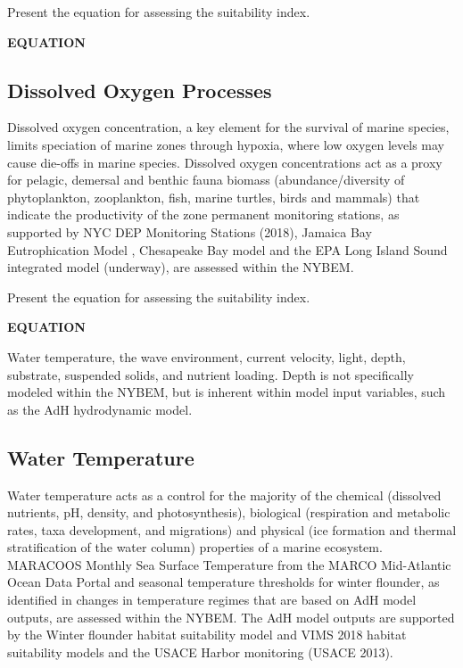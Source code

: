 \documentclass[
]{book}
\begin{document}
Present the equation for assessing the suitability index.

\textbf{EQUATION}

\hypertarget{dissolved-oxygen-processes}{%
\subsection{Dissolved Oxygen Processes}\label{dissolved-oxygen-processes}}

Dissolved oxygen concentration, a key element for the survival of marine species, limits speciation of marine zones through hypoxia, where low oxygen levels may cause die-offs in marine species. Dissolved oxygen concentrations act as a proxy for pelagic, demersal and benthic fauna biomass (abundance/diversity of phytoplankton, zooplankton, fish, marine turtles, birds and mammals) that indicate the productivity of the zone permanent monitoring stations, as supported by NYC DEP Monitoring Stations (2018), Jamaica Bay Eutrophication Model \citep{fischbach_building_2018}, Chesapeake Bay model \citep{cerco_threedimensional_1993} and the EPA Long Island Sound integrated model (underway), are assessed within the NYBEM.

Present the equation for assessing the suitability index.

\textbf{EQUATION}

Water temperature, the wave environment, current velocity, light, depth, substrate, suspended solids, and nutrient loading. Depth is not specifically modeled within the NYBEM, but is inherent within model input variables, such as the AdH hydrodynamic model.

\hypertarget{water-temperature}{%
\subsection{Water Temperature}\label{water-temperature}}

Water temperature acts as a control for the majority of the chemical (dissolved nutrients, pH, density, and photosynthesis), biological (respiration and metabolic rates, taxa development, and migrations) and physical (ice formation and thermal stratification of the water column) properties of a marine ecosystem.\\
MARACOOS Monthly Sea Surface Temperature from the MARCO Mid-Atlantic Ocean Data Portal and seasonal temperature thresholds for winter flounder, as identified in changes in temperature regimes that are based on AdH model outputs, are assessed within the NYBEM. The AdH model outputs are supported by the Winter flounder habitat suitability model \citep{banner_usfws_2001} and VIMS 2018 habitat suitability models and the USACE Harbor monitoring (USACE 2013).
\end{document}
